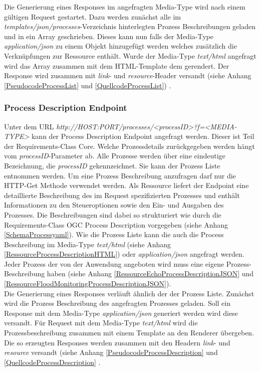 Die Generierung eines Responses im angefragten Media-Type wird nach einem gültigen Request gestartet. 
Dazu werden zunächst alle im \textit{templates/json/processes}-Verzeichnis hinterlegten Prozess Beschreibungen geladen und in ein Array geschrieben. 
Dieses kann nun falls der Media-Type \textit{application/json} zu einem Objekt hinzugefügt werden welches zusätzlich die Verknüpfungen zur Ressource enthält. 
Wurde der Media-Type \textit{text/html} angefragt wird das Array zusammen mit dem HTML-Template dem gerendert. 
Der Response wird zusammen mit \textit{link}- und \textit{resource}-Header versandt (siehe Anhang \ref{PseudocodeProcessList} und \ref{QuellcodeProcessList}) 
\cite{ogc_api_processes_core}.

\subsubsection{Process Description Endpoint}
Unter dem URL \textit{http://HOST:PORT/processes/<processID>?f=<MEDIA-TYPE>} kann der Process Description Endpoint angefragt werden. 
Dieser ist Teil der Requirements-Class Core. 
Welche Prozessdetails zurückgegeben werden hängt vom \textit{processID}-Parameter ab. Alle Prozesse werden über eine 
eindeutige Bezeichnung, die \textit{processID} gekennzeichnet. 
Sie kann der Prozess Liste entnommen werden. Um eine Prozess Beschreibung anzufragen darf nur die HTTP-Get Methode verwendet werden.   
Als Ressource liefert der Endpoint eine detaillierte Beschreibung des im Request spezifizierten Prozesses und enthält Informationen 
zu den Steueroptionen sowie den Ein- und Ausgaben des Prozesses.
Die Beschreibungen sind dabei so strukturiert wie durch die Requirements-Class OGC Process Description vorgegeben (siehe Anhang \ref{SchemaProcessyaml}). 
Wie die Prozess Liste kann die auch die Process Beschreibung im Media-Type \textit{text/html} (siehe Anhang \ref{RessourceProcessDescriptionHTML}) 
oder \textit{application/json} angefragt werden.
Jeder Prozess der von der Anwendung angeboten wird muss eine eigene Prozess-Beschreibung haben (siehe Anhang \ref{RessourceEchoProcessDescriptionJSON} und 
\ref{RessourceFloodMonitoringProcessDescriptionJSON}).\\

Die Generierung eines Responses verläuft ähnlich der der Prozess Liste. Zunächst wird die Prozess Beschreibung des angefragten Prozesses geladen. 
Soll ein Response mit dem Media-Type \textit{application/json} generiert werden wird diese versandt. 
Für Request mit dem Media-Type \textit{text/html} wird die Prozessbeschreibung zusammen mit einem Template an den Renderer übergeben. 
Die so erzeugten Responses werden zusammen mit den Headern \textit{link}- und \textit{resource} versandt (siehe Anhang \ref{PseudocodeProcessDescription} 
und \ref{QuellcodeProcessDescription} \cite{ogc_api_processes_core}.

